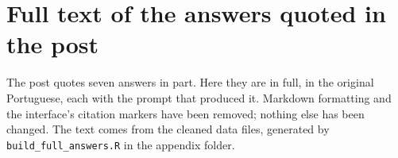 \documentclass[11pt]{article}
\begin{document}
\clearpage
\section{Full text of the answers quoted in the post}

The post quotes seven answers in part. Here they are in full, in the original Portuguese, each with the prompt that produced it. Markdown formatting and the interface's citation markers have been removed; nothing else has been changed. The text comes from the cleaned data files, generated by \nolinkurl{build_full_answers.R} in the appendix folder.


\end{document}
